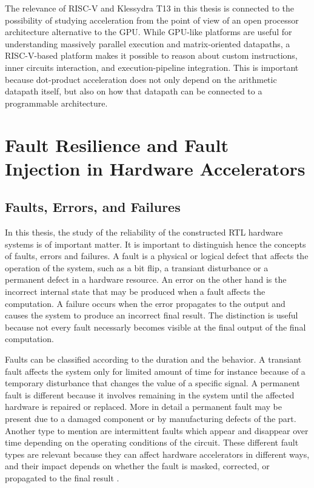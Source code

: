 The relevance of RISC-V and Klessydra T13 in this thesis is connected to the possibility of studying acceleration from the point of view of an open processor architecture alternative to the GPU. While GPU-like platforms are useful for understanding massively parallel execution and matrix-oriented datapaths, a RISC-V-based platform makes it possible to reason about custom instructions, inner circuits interaction, and execution-pipeline integration. This is important because dot-product acceleration does not only depend on the arithmetic datapath itself, but also on how that datapath can be connected to a programmable architecture.


\section{Fault Resilience and Fault Injection in Hardware Accelerators}
\label{sec:fault_resilience_background}


\subsection{Faults, Errors, and Failures}
In this thesis, the study of the reliability of the constructed RTL hardware systems is of important matter. It is important to distinguish hence the concepts of faults, errors and failures. A fault is a physical or logical defect that affects the operation of the system, such as a bit flip, a transiant disturbance or a permanent defect in a hardware resource. An error on the other hand is the incorrect internal state that may be produced when a fault affects the computation. A failure occurs when the error propagates to the output and causes the system to produce an incorrect final result. The distinction is useful because not every fault necessarly becomes visible at the final output of the final computation.

Faults can be classified according to the duration and the behavior. A transiant fault affects the system only for limited amount of time for instance because of a temporary disturbance that changes the value of a specific signal. A permanent fault is different because it involves remaining in the system until the affected hardware is repaired or replaced. More in detail a permanent fault may be present due to a damaged component or by manufacturing defects of the part. Another type to mention are intermittent faults which appear and disappear over time depending on the operating conditions of the circuit. These different fault types are relevant because they can affect hardware accelerators in different ways, and their impact depends on whether the fault is masked, corrected, or propagated to the final result \cite{avizienis2004dependability}. 

